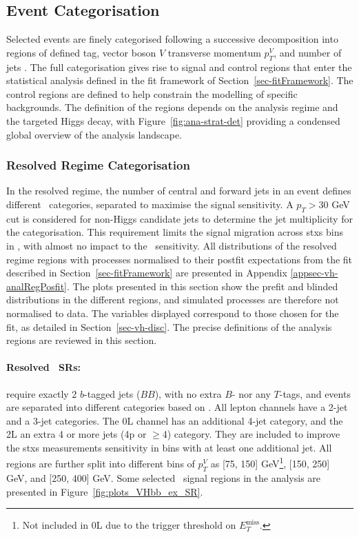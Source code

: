 \subsection{Event Categorisation}\label{sec-eventCat}
Selected events are finely categorised following a successive decomposition into regions of defined tag, vector boson $V$ transverse momentum $p_T^V$, and number of jets \nj. The full categorisation gives rise to signal and control regions that enter the statistical analysis defined in the fit framework of Section~\ref{sec-fitFramework}. The control regions are defined to help constrain the modelling of specific backgrounds. The definition of the regions depends on the analysis regime and the targeted Higgs decay, with Figure~\ref{fig:ana-strat-det} providing a condensed global overview of the analysis landscape.

\subsubsection{Resolved Regime Categorisation}
In the resolved regime, the number of central and forward jets in an event defines different \nj\ categories, separated to maximise the signal sensitivity. A $p_T > 30$ GeV cut is considered for non-Higgs candidate jets to determine the jet multiplicity for the categorisation. This requirement limits the signal migration across \gls{stxs} bins in \vhb, with almost no impact to the \vhc\ sensitivity. All distributions of the resolved regime regions with processes normalised to their postfit expectations from the fit described in Section~\ref{sec-fitFramework} are presented in Appendix \ref{appsec-vh-analRegPosfit}. The plots presented in this section show the prefit and blinded distributions in the different regions, and simulated processes are therefore not normalised to data. The variables displayed correspond to those chosen for the fit, as detailed in Section~\ref{sec-vh-disc}. The precise definitions of the analysis regions are reviewed in this section.

\paragraph{Resolved \boldvhb\ SRs:} require exactly 2 $b$-tagged jets ($BB$), with no extra $B$- nor any $T$-tags, and events are separated into different categories based on \nj. All lepton channels have a 2-jet and a 3-jet categories. The 0L channel has an additional 4-jet category, and the 2L an extra 4 or more jets (4p or $\geq$4) category. They are included to improve the \gls{stxs} measurements sensitivity in bins with at least one additional jet. All regions are further split into different bins of $p_T^V$ as [75, 150] GeV\footnote{Not included in 0L due to the trigger threshold on $E_T^{\textrm{miss}}$.}, [150, 250] GeV, and [250, 400] GeV. Some selected \vhb\ signal regions in the analysis are presented in Figure~\ref{fig:plots_VHbb_ex_SR}. 

